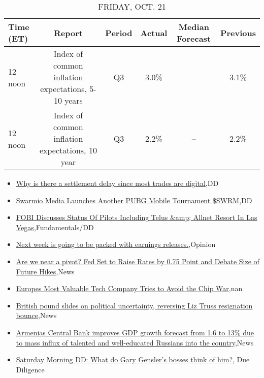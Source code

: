 \documentclass{article}%
\begin{document}
%


\begin{table}[htbp]%
\caption{FRIDAY, OCT. 21}%
\centering%
\begin{adjustbox}{width=1\textwidth}%
\begin{tabular}{lccccc}
\toprule
Time (ET) &                                             Report & Period & Actual & Median Forecast & Previous \\
\midrule
  12 noon & Index of common inflation expectations, 5-10 years &     Q3 &   3.0\% &              -- &     3.1\% \\
  12 noon &    Index of common inflation expectations, 10 year &     Q3 &   2.2\% &              -- &     2.2\% \\
\bottomrule
\end{tabular}
%
\end{adjustbox}%
\end{table}

%
\begin{itemize}%
\item%
\href{https://reddit.com/r/wallstreetbets/comments/yal5vc/why\_is\_there\_a\_settlement\_delay\_since\_most\_trades/}{Why is there a settlement delay since most trades are digital},DD%
\item%
\href{https://reddit.com/r/Baystreetbets/comments/y9v0un/swarmio\_media\_launches\_another\_pubg\_mobile/}{Swarmio Media Launches Another PUBG Mobile Tournament \$SWRM},DD%
\item%
\href{https://reddit.com/r/StockMarket/comments/yaf9g8/fobi\_discusses\_status\_of\_pilots\_including\_telus/}{FOBI Discusses Status Of Pilots Including Telus \&amp; Allnet Resort In Las Vegas},Fundamentals/DD%
\item%
\href{https://reddit.com/r/StockMarket/comments/yaanis/next\_week\_is\_going\_to\_be\_packed\_with\_earnings/}{Next week is going to be packed with earnings releases.},Opinion%
\item%
\href{https://reddit.com/r/Economics/comments/ya6ji3/are\_we\_near\_a\_pivot\_fed\_set\_to\_raise\_rates\_by\_075/}{Are we near a pivot? Fed Set to Raise Rates by 0.75 Point and Debate Size of Future Hikes},News%
\item%
\href{https://reddit.com/r/Economics/comments/ya19fw/europes\_most\_valuable\_tech\_company\_tries\_to\_avoid/}{Europes Most Valuable Tech Company Tries to Avoid the Chip War},nan%
\item%
\href{https://reddit.com/r/Economics/comments/y9vd4g/british\_pound\_slides\_on\_political\_uncertainty/}{British pound slides on political uncertainty, reversing Liz Truss resignation bounce},News%
\item%
\href{https://reddit.com/r/Economics/comments/y9u6zq/armenias\_central\_bank\_improves\_gdp\_growth/}{Armenias Central Bank improves GDP growth forecast from 1.6 to 13\% due to mass influx of talented and well-educated Russians into the country},News%
\item%
\href{https://reddit.com/r/Superstonk/comments/yak3hj/saturday\_morning\_dd\_what\_do\_gary\_genslers\_bosses/}{Saturday Morning DD: What do Gary Gensler's bosses think of him?}, Due Diligence%
\end{itemize}%
\end{document}

